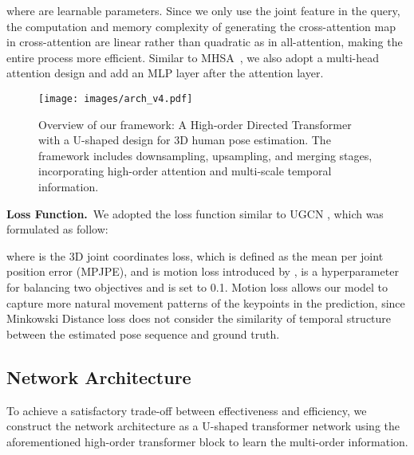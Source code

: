 \documentclass{article}
\begin{document}
\noindent where  are learnable parameters. Since we only use the joint feature in the query, the computation and memory complexity of generating the cross-attention map in cross-attention are linear rather than quadratic as in all-attention, making the entire process more efficient. Similar to MHSA~\cite{vaswani2017attention}, we also adopt a multi-head attention design and add an MLP layer after the attention layer.

\begin{figure*}[!t]
    \centering
    \centerline{\texttt{[image: images/arch\_v4.pdf]}}
    \vspace{-2mm}
    \caption{\small Overview of our framework: A High-order Directed Transformer with a U-shaped design for 3D human pose estimation. The framework includes downsampling, upsampling, and merging stages, incorporating high-order attention and multi-scale temporal information.}
    \vspace{-2mm}
    \label{fig:arch}
\end{figure*}


\noindent \textbf{Loss Function.}~We adopted the loss function similar to UGCN \cite{wang2020-motion}, which was formulated as follow:


\noindent where  is the 3D joint coordinates loss, which is defined as the mean per joint position error (MPJPE), and  is motion loss introduced by \cite{wang2020-motion},  is a hyperparameter for balancing two objectives and is set to 0.1. Motion loss allows our model to capture more natural movement patterns of the keypoints in the prediction, since Minkowski Distance loss does not consider the similarity of temporal structure between the estimated pose sequence and ground truth. 



\subsection{Network Architecture}
To achieve a satisfactory trade-off between effectiveness and efficiency, we construct the network architecture as a U-shaped transformer network using the aforementioned high-order transformer block to learn the multi-order information. 
\end{document}
